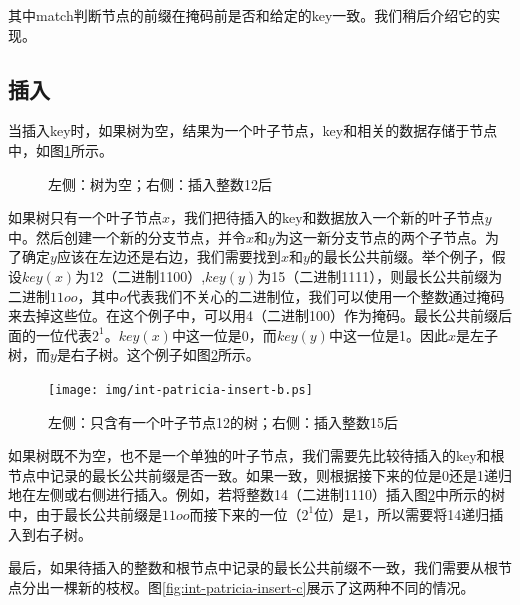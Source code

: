 \documentclass[b5paper]{ctexart}
\begin{document}
其中match判断节点的前缀在掩码前是否和给定的key一致。我们稍后介绍它的实现。

\subsection{插入}
当插入key时，如果树为空，结果为一个叶子节点，key和相关的数据存储于节点中，如图\ref{fig:int-patricia-insert-a}所示。

\begin{figure}[htbp]
  \centering
  \caption{左侧：树为空；右侧：插入整数12后}
  \label{fig:int-patricia-insert-a}
\end{figure}

如果树只有一个叶子节点$x$，我们把待插入的key和数据放入一个新的叶子节点$y$中。然后创建一个新的分支节点，并令$x$和$y$为这一新分支节点的两个子节点。为了确定$y$应该在左边还是右边，我们需要找到$x$和$y$的最长公共前缀。举个例子，假设$key(x)$为12（二进制1100）,$key(y)$为15（二进制1111），则最长公共前缀为二进制$11oo$，其中$o$代表我们不关心的二进制位，我们可以使用一个整数通过掩码来去掉这些位。在这个例子中，可以用4（二进制100）作为掩码。最长公共前缀后面的一位代表$2^1$。$key(x)$中这一位是0，而$key(y)$中这一位是1。因此$x$是左子树，而$y$是右子树。这个例子如图\ref{fig:int-patricia-insert-b}所示。

\begin{figure}[htbp]
  \centering
  \texttt{[image: img/int-patricia-insert-b.ps]}
  \caption{左侧：只含有一个叶子节点12的树；右侧：插入整数15后}
  \label{fig:int-patricia-insert-b}
\end{figure}

如果树既不为空，也不是一个单独的叶子节点，我们需要先比较待插入的key和根节点中记录的最长公共前缀是否一致。如果一致，则根据接下来的位是0还是1递归地在左侧或右侧进行插入。例如，若将整数14（二进制1110）插入图\ref{fig:int-patricia-insert-b}中所示的树中，由于最长公共前缀是$11oo$而接下来的一位（$2^1$位）是1，所以需要将14递归插入到右子树。

最后，如果待插入的整数和根节点中记录的最长公共前缀不一致，我们需要从根节点分出一棵新的枝杈。图\ref{fig:int-patricia-insert-c}展示了这两种不同的情况。
\end{document}
